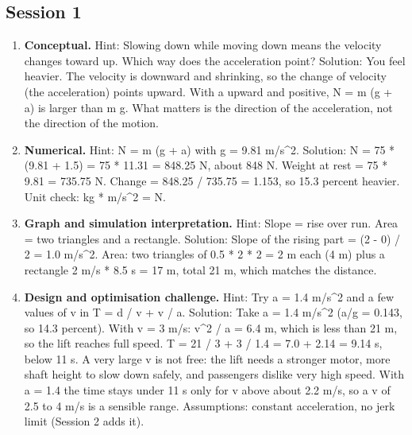 \documentclass[11pt,a4paper]{article}
\begin{document}
\subsection*{Session 1}
\begin{enumerate}[nosep]
\item \textbf{Conceptual.} Hint: Slowing down while moving down means the velocity changes toward up. Which way does the acceleration point? Solution: You feel heavier. The velocity is downward and shrinking, so the change of velocity (the acceleration) points upward. With a upward and positive, N = m (g + a) is larger than m g. What matters is the direction of the acceleration, not the direction of the motion.
\item \textbf{Numerical.} Hint: N = m (g + a) with g = 9.81 m/s\textasciicircum{}2. Solution: N = 75 * (9.81 + 1.5) = 75 * 11.31 = 848.25 N, about 848 N. Weight at rest = 75 * 9.81 = 735.75 N. Change = 848.25 / 735.75 = 1.153, so 15.3 percent heavier. Unit check: kg * m/s\textasciicircum{}2 = N.
\item \textbf{Graph and simulation interpretation.} Hint: Slope = rise over run. Area = two triangles and a rectangle. Solution: Slope of the rising part = (2 - 0) / 2 = 1.0 m/s\textasciicircum{}2. Area: two triangles of 0.5 * 2 * 2 = 2 m each (4 m) plus a rectangle 2 m/s * 8.5 s = 17 m, total 21 m, which matches the distance.
\item \textbf{Design and optimisation challenge.} Hint: Try a = 1.4 m/s\textasciicircum{}2 and a few values of v in T = d / v + v / a. Solution: Take a = 1.4 m/s\textasciicircum{}2 (a/g = 0.143, so 14.3 percent). With v = 3 m/s: v\textasciicircum{}2 / a = 6.4 m, which is less than 21 m, so the lift reaches full speed. T = 21 / 3 + 3 / 1.4 = 7.0 + 2.14 = 9.14 s, below 11 s. A very large v is not free: the lift needs a stronger motor, more shaft height to slow down safely, and passengers dislike very high speed. With a = 1.4 the time stays under 11 s only for v above about 2.2 m/s, so a v of 2.5 to 4 m/s is a sensible range. Assumptions: constant acceleration, no jerk limit (Session 2 adds it).
\end{enumerate}
\end{document}
